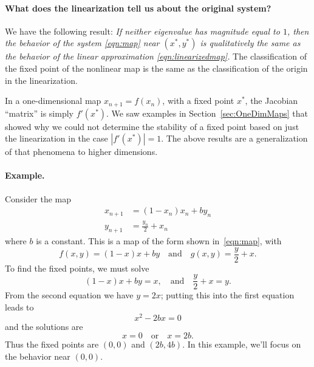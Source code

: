 \documentclass{book}
\begin{document}
\paragraph{What does the linearization tell us about the original system?}
We have the following result:
\emph{If neither eigenvalue has magnitude equal to $1$,
then the behavior of the system \eqref{eqn:map}
near $(x^*,y^*)$ is qualitatively the same as the behavior of the
linear approximation \eqref{eqn:linearizedmap}.}
The classification of the fixed point of the nonlinear map
is the same as the classification of the origin in the linearization.

In a one-dimensional map $x_{n+1} = f(x_n)$, with a fixed
point $x^*$, the 
Jacobian ``matrix'' is simply $f'(x^*)$.  We saw examples
in Section~\ref{sec:OneDimMaps} that showed why we could not determine
the stability of a fixed point based on just the linearization
in the case $|f'(x^*)|=1$.  The above results are a generalization
of that phenomena to higher dimensions.


\paragraph{Example.}
Consider the map
\begin{equation}
\begin{split}
  x_{n+1} & = (1- x_n)x_n + b y_n \\
  y_{n+1} & = \frac{y_n}{2} + x_n
\end{split}
\label{eqn:linearizationexample}
\end{equation}
where $b$ is a constant.
This is a map of the form shown in~\eqref{eqn:map}, with
\begin{equation}
   f(x,y) = (1-x)x+by \quad \textrm{and} \quad g(x,y) = \frac{y}{2}+x.
\end{equation}
To find the fixed points, we must solve
\begin{equation}
   (1 - x)x + by = x, \quad \textrm{and} \quad \frac{y}{2}+x = y.
\end{equation}
From the second equation we have $y = 2x$; putting this into the first equation
leads to
\begin{equation}
   x^2-2bx = 0
\end{equation}
and the solutions are
\begin{equation}
  x = 0 \quad \textrm{or} \quad x= 2b.
\end{equation}
Thus the fixed points are
$(0,0)$ and $(2b,4b)$.
In this example, we'll focus on the behavior near $(0,0)$.
\end{document}
